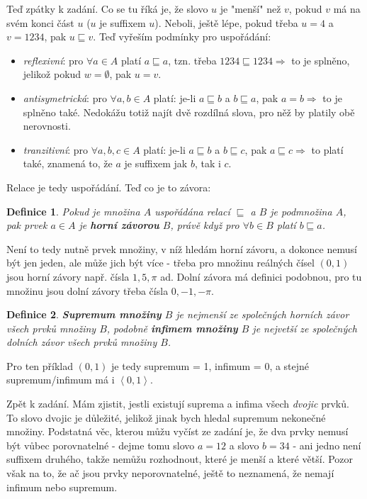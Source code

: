 \documentclass{article}
\newtheorem{definice}{Definice}[section]
\begin{document}
Teď zpátky k zadání. Co se tu říká je, že slovo $u$ je "menší" než $v$, pokud $v$ má na svém konci část $u$ ($u$ je suffixem $u$). Neboli, ještě lépe, pokud třeba $u = 4$ a $v = 1234$, pak $u \sqsubseteq v$. Teď vyřeším podmínky pro uspořádání: 

\begin{itemize}
 \item \emph{reflexivní}: pro $\forall a \in A$ platí $a \sqsubseteq a$, tzn. třeba $1234 \sqsubseteq 1234 \Rightarrow$ to je splněno, jelikož pokud $w = \emptyset$, pak $u = v$.
 \item \emph{antisymetrická}: pro $\forall a,b \in A$ platí: je-li $a \sqsubseteq b$ a $b \sqsubseteq a$, pak $a = b \Rightarrow$ to je splněno také. Nedokážu totiž najít dvě rozdílná slova, pro něž by platily obě nerovnosti. 
 \item \emph{tranzitivní}:  pro $\forall a,b,c \in A$ platí: je-li $a \sqsubseteq b$ a $b \sqsubseteq c$, pak $a \sqsubseteq c \Rightarrow$ to platí také, znamená to, že $a$ je suffixem jak $b$, tak i $c$. 
\end{itemize} 

Relace je tedy uspořádání. Teď co je to závora:

\begin{definice}
Pokud je množina $A$ uspořádána relací $\sqsubseteq$ a $B$ je podmnožina $A$, pak prvek $a \in A$ je \textbf{horní závorou} $B$, právě když pro $\forall b \in B$ platí $b \sqsubseteq a$.
\end{definice}

Není to tedy nutně prvek množiny, v níž hledám horní závoru, a dokonce nemusí být jen jeden, ale může jich být více - třeba pro množinu reálných čísel $\left(0,1\right)$ jsou horní závory např. čísla $1,5,\pi$ ad. Dolní závora má definici podobnou, pro tu množinu jsou dolní závory třeba čísla $0,-1,-\pi$.

\begin{definice}
\textbf{Supremum množiny} $B$ je nejmenší ze společných horních závor všech prvků množiny $B$, podobně \textbf{infimem množiny} $B$ je nejvetší ze společných dolních závor všech prvků množiny $B$. 
\end{definice}

Pro ten příklad $\left(0,1\right)$ je tedy supremum = 1, infimum = 0, a stejné supremum/infimum má i $\left<0,1\right>$.

Zpět k zadání. Mám zjistit, jestli existují suprema a infima všech \emph{dvojic} prvků. To slovo dvojic je důležité, jelikož jinak bych hledal supremum nekonečné množiny. Podstatná věc, kterou můžu vyčíst ze zadání je, že dva prvky nemusí být vůbec porovnatelné - dejme tomu slovo $a = 12$ a slovo $b = 34$ - ani jedno není suffixem druhého, takže nemůžu rozhodnout, které je menší a které větší. Pozor však na to, že ač jsou prvky neporovnatelné, ještě to neznamená, že nemají infimum nebo supremum. 
\end{document}
